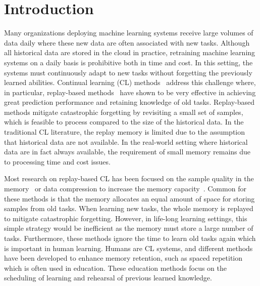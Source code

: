 
\section{Introduction}\label{sec:introduction}

Many organizations deploying machine learning systems receive large volumes of data daily where these new data are often associated with new tasks. Although all historical data are stored in the cloud in practice, retraining machine learning systems on a daily basis is prohibitive both in time and cost. 
In this setting, the systems must continuously adapt to new tasks without forgetting the previously learned abilities. Continual learning (CL) methods~\citep{de2019continual, parisi2019continual} 
address this challenge where, in particular, replay-based methods~\citep{chaudhry2019tiny, hayes2020remind} have shown to be very effective in achieving great prediction performance and retaining knowledge of old tasks. 
Replay-based methods mitigate catastrophic forgetting by revisiting a small set of samples, which is feasible to process compared to the size of the historical data.
In the traditional CL literature, the replay memory is limited due to the assumption that historical data are not available. In the real-world setting where historical data are in fact always available, the requirement of small memory remains due to processing time and cost issues. %


Most research on replay-based CL has been focused on the sample quality in the memory~\citep{aljundi2019gradient, borsos2020coresets, chaudhry2019tiny, chrysakis2020online, nguyen2017variational, rebuffi2017icarl, yoon2021online} or data compression to increase the memory capacity~\citep{hayes2020remind, iscen2020memory, pellegrini2019latent}. Common for these methods is that the memory allocates an equal amount of space for storing samples from old tasks. When learning new tasks, the whole memory is replayed to mitigate catastrophic forgetting.
However, in life-long learning settings, this simple strategy would be inefficient as the memory must store a large number of tasks. Furthermore, these methods ignore the time to learn old tasks again which is important in human learning. 
Humans are CL systems, and different methods have been developed to enhance memory retention, such as spaced repetition~\citep{dempster1989spacing, ebbinghaus2013memory, landauer1978optimum} which is often used in education. These education methods focus on the scheduling of learning and rehearsal of previous learned knowledge.  

